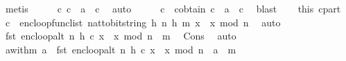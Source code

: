 \begin{isabellebody}
\ metis\isanewline
\ \ \isamarkupfalse%
\ \isamarkupfalse%
\ {\isachardoublequoteopen}{\isasymexists}c{\isacharprime}{\kern0pt}{\isachardot}{\kern0pt}\ c\ {\isacharequal}{\kern0pt}\ {\isacharquery}{\kern0pt}a{\isacharprime}{\kern0pt}\ {\isacharhash}{\kern0pt}\ c{\isacharprime}{\kern0pt}{\isachardoublequoteclose}\ \isamarkupfalse%
\ auto\isanewline
\ \ \isamarkupfalse%
\ \isamarkupfalse%
\ c{\isacharprime}{\kern0pt}\ \ c{\isacharunderscore}{\kern0pt}obtain{\isacharcolon}{\kern0pt}\ {\isachardoublequoteopen}c\ {\isacharequal}{\kern0pt}\ {\isacharquery}{\kern0pt}a{\isacharprime}{\kern0pt}\ {\isacharhash}{\kern0pt}\ c{\isacharprime}{\kern0pt}{\isachardoublequoteclose}\ \isamarkupfalse%
\ blast\isanewline
\ \ \isamarkupfalse%
\ this\ c{\isacharunderscore}{\kern0pt}part\ \isamarkupfalse%
\ {\isachardoublequoteopen}c{\isacharprime}{\kern0pt}\ {\isacharequal}{\kern0pt}\ enc{\isacharunderscore}{\kern0pt}loop{\isacharunderscore}{\kern0pt}func{\isacharunderscore}{\kern0pt}list\ {\isacharparenleft}{\kern0pt}nat{\isacharunderscore}{\kern0pt}to{\isacharunderscore}{\kern0pt}bitstring\ h{\isacharcomma}{\kern0pt}\ n{\isacharcomma}{\kern0pt}\ h{\isacharcomma}{\kern0pt}\ m{\isacharparenright}{\kern0pt}\ {\isacharparenleft}{\kern0pt}x\ {\isacharasterisk}{\kern0pt}\ x\ mod\ n{\isacharparenright}{\kern0pt}{\isachardoublequoteclose}\ \isamarkupfalse%
\ auto\isanewline
\ \ \isamarkupfalse%
\ {\isachardoublequoteopen}fst\ {\isacharparenleft}{\kern0pt}enc{\isacharunderscore}{\kern0pt}loop{\isacharunderscore}{\kern0pt}alt\ {\isacharparenleft}{\kern0pt}n{\isacharcomma}{\kern0pt}\ h{\isacharcomma}{\kern0pt}\ c{\isacharprime}{\kern0pt}{\isacharparenright}{\kern0pt}\ {\isacharparenleft}{\kern0pt}x\ {\isacharasterisk}{\kern0pt}\ x\ mod\ n{\isacharparenright}{\kern0pt}{\isacharparenright}{\kern0pt}\ {\isacharequal}{\kern0pt}\ m{\isachardoublequoteclose}\ \isamarkupfalse%
\ Cons\ \isamarkupfalse%
\ auto\isanewline
\ \ \isamarkupfalse%
\ a{\isacharunderscore}{\kern0pt}with{\isacharunderscore}{\kern0pt}m{\isacharcolon}{\kern0pt}\ {\isachardoublequoteopen}a\ {\isacharhash}{\kern0pt}\ fst\ {\isacharparenleft}{\kern0pt}enc{\isacharunderscore}{\kern0pt}loop{\isacharunderscore}{\kern0pt}alt\ {\isacharparenleft}{\kern0pt}n{\isacharcomma}{\kern0pt}\ h{\isacharcomma}{\kern0pt}\ c{\isacharprime}{\kern0pt}{\isacharparenright}{\kern0pt}\ {\isacharparenleft}{\kern0pt}x\ {\isacharasterisk}{\kern0pt}\ x\ mod\ n{\isacharparenright}{\kern0pt}{\isacharparenright}{\kern0pt}\ {\isacharequal}{\kern0pt}\ a\ {\isacharhash}{\kern0pt}\ m{\isachardoublequoteclose}\ \isamarkupfalse%

\end{isabellebody}

